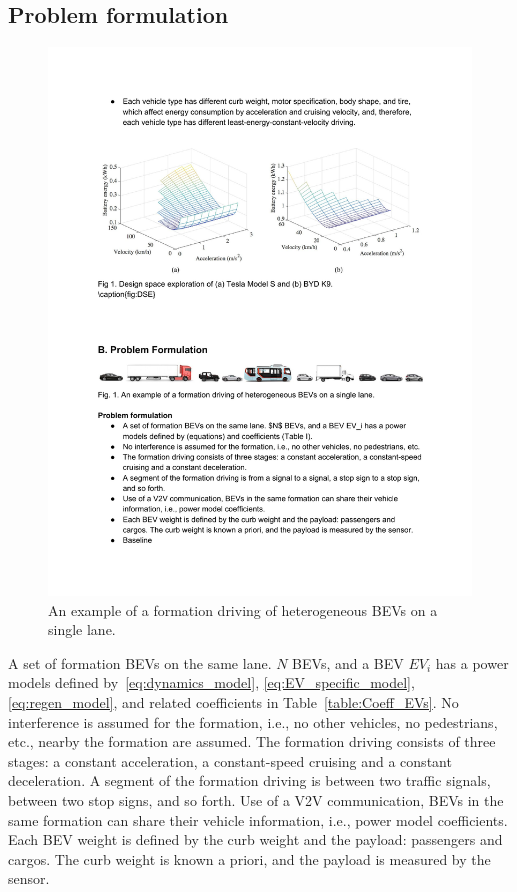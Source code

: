 \documentclass{IEEEtran}
\begin{document}
\subsection{Problem formulation} \label{subsec:problem}

\begin{figure}	%
\centering
\includegraphics[width=1.0\hsize]{Figures/Example.pdf}
\caption{An example of a formation driving of heterogeneous BEVs on a single lane.}
\label{fig:example}
\end{figure} 

A set of formation BEVs on the same lane. $N$ BEVs, and a BEV $EV_i$ has a power models defined by~\eqref{eq:dynamics_model}, \eqref{eq:EV_specific_model}, \eqref{eq:regen_model}, and related coefficients in Table~\ref{table:Coeff_EVs}.
No interference is assumed for the formation, i.e.,  no other vehicles, no pedestrians, etc., nearby the formation are assumed.
The formation driving consists of three stages: a constant acceleration, a constant-speed cruising and a constant deceleration.
A segment of the formation driving is between two traffic signals, between two stop signs, and so forth.
Use of a V2V communication, BEVs in the same formation can share their vehicle information, i.e., power model coefficients.
Each BEV weight is defined by the curb weight and the payload: passengers and cargos. The curb weight is known a priori, and the payload is measured by the sensor. 
\end{document}
